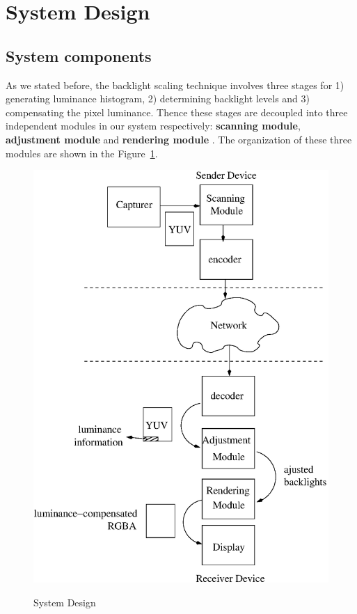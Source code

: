 \section{System Design}
\label{sec:design}

\subsection{System components}
As we stated before, the backlight scaling technique involves three
stages for 1) generating luminance histogram, 2) determining backlight
levels and 3) compensating the pixel luminance. Thence these stages are
decoupled into three independent modules in our system respectively:
{\bf scanning module}, {\bf adjustment module } and {\bf rendering
  module }. The organization of these three modules are shown in the
Figure~\ref{fig:design}.

\begin{figure}[t]
  \begin{center}
  \label{fig:design}
  \includegraphics[scale=.5]{./figures/design.eps}
  \caption{System Design}
  \end{center}
\end{figure}


